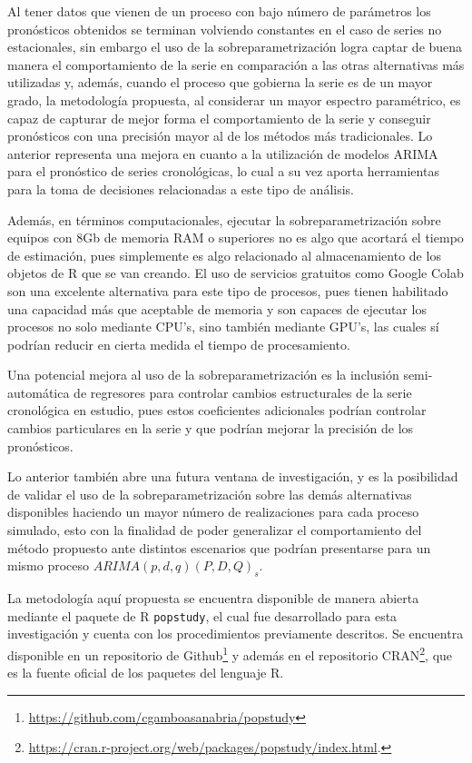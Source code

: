 \documentclass[
]{article}
\begin{document}
Al tener datos que vienen de un proceso con bajo número de parámetros
los pronósticos obtenidos se terminan volviendo constantes en el caso de
series no estacionales, sin embargo el uso de la sobreparametrización
logra captar de buena manera el comportamiento de la serie en
comparación a las otras alternativas más utilizadas y, además, cuando el
proceso que gobierna la serie es de un mayor grado, la metodología
propuesta, al considerar un mayor espectro paramétrico, es capaz de
capturar de mejor forma el comportamiento de la serie y conseguir
pronósticos con una precisión mayor al de los métodos más tradicionales.
Lo anterior representa una mejora en cuanto a la utilización de modelos
ARIMA para el pronóstico de series cronológicas, lo cual a su vez aporta
herramientas para la toma de decisiones relacionadas a este tipo de
análisis.

Además, en términos computacionales, ejecutar la sobreparametrización
sobre equipos con 8Gb de memoria RAM o superiores no es algo que
acortará el tiempo de estimación, pues simplemente es algo relacionado
al almacenamiento de los objetos de R que se van creando. El uso de
servicios gratuitos como Google Colab son una excelente alternativa para
este tipo de procesos, pues tienen habilitado una capacidad más que
aceptable de memoria y son capaces de ejecutar los procesos no solo
mediante CPU's, sino también mediante GPU's, las cuales sí podrían
reducir en cierta medida el tiempo de procesamiento.

Una potencial mejora al uso de la sobreparametrización es la inclusión
semi-automática de regresores para controlar cambios estructurales de la
serie cronológica en estudio, pues estos coeficientes adicionales
podrían controlar cambios particulares en la serie y que podrían mejorar
la precisión de los pronósticos.

Lo anterior también abre una futura ventana de investigación, y es la
posibilidad de validar el uso de la sobreparametrización sobre las demás
alternativas disponibles haciendo un mayor número de realizaciones para
cada proceso simulado, esto con la finalidad de poder generalizar el
comportamiento del método propuesto ante distintos escenarios que
podrían presentarse para un mismo proceso \(ARIMA(p,d,q)(P,D,Q)_s\).

La metodología aquí propuesta se encuentra disponible de manera abierta
mediante el paquete de R \texttt{popstudy}, el cual fue desarrollado
para esta investigación y cuenta con los procedimientos previamente
descritos. Se encuentra disponible en un repositorio de
Github\footnote{\url{https://github.com/cgamboasanabria/popstudy}} y
además en el repositorio CRAN\footnote{\url{https://cran.r-project.org/web/packages/popstudy/index.html}.},
que es la fuente oficial de los paquetes del lenguaje R.
\end{document}
